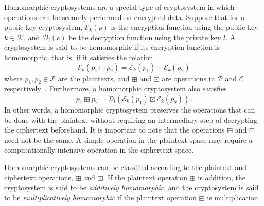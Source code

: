 Homomorphic cryptosystems are a special type of cryptosystem in which operations can be securely performed on encrypted data. Suppose that for a public-key cryptosystem, $\mathcal{E}_k \left(p \right)$ is the encryption function using the public key $k \in \mathcal{K}$, and $\mathcal{D}_l \left(c \right)$ be the decryption function using the private key $l$. A cryptosystem is said to be homomorphic if its encryption function is homomorphic, that is, if it satisfies the relation
\begin{equation}
    \mathcal{E}_k \left(p_1 \boxplus p_2\right) = \mathcal{E}_k \left(p_1\right) \boxdot \mathcal{E}_k \left(p_2\right)
\end{equation}
where $p_1, p_2 \in \mathcal{P}$ are the plaintexts, and $\boxplus$ and $\boxdot$ are operations in $\mathcal{P}$ and $\mathcal{C}$ respectively~\cite{fontaine_survey_2007}. Furthermore, a homomorphic cryptosystem also satisfies~\cite{li_elliptic_2012}
\begin{equation}
    p_1 \boxplus p_2 = \mathcal{D}_l \left( \mathcal{E}_k \left(p_1\right) \boxdot \mathcal{E}_k \left(p_2\right) \right).
\end{equation}
In other words, a homomorphic cryptosystem preserves the operations that can be done with the plaintext without requiring an intermediary step of decrypting the ciphertext beforehand. It is important to note that the operations $\boxplus$ and $\boxdot$ need not be the same. A simple operation in the plaintext space may require a computationally intensive operation in the ciphertext space.

Homomorphic cryptosystems can be classified according to the plaintext and ciphertext operations, $\boxplus$ and $\boxdot$. If the plaintext operation $\boxplus$ is addition, the cryptosystem is said to be \textit{additively homomorphic}, and the cryptosystem is said to be \textit{multiplicatively homomorphic} if the plaintext operation $\boxplus$ is multiplication.


